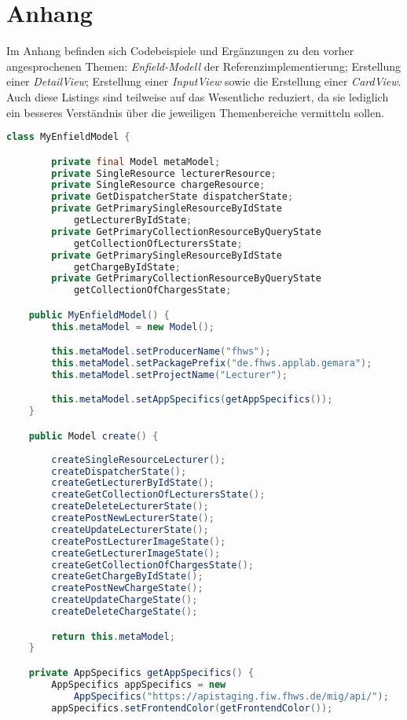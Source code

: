 \chapter{Anhang}

Im Anhang befinden sich Codebeispiele und Ergänzungen zu den vorher angesprochenen Themen: \textit{Enfield-Modell} der Referenzimplementierung; Erstellung einer \textit{DetailView}; Erstellung einer \textit{InputView} sowie die Erstellung einer \textit{CardView}. Auch diese Listings sind teilweise auf das Wesentliche reduziert, da sie lediglich ein besseres Verständnis über die jeweiligen Themenbereiche vermitteln sollen.

\newpage

\begin{lstlisting}[label=lst:enfield_model,
language=java,
firstnumber=1,
caption=Beschreibung des \textit{Enfield-Modell} der Referenzimplementierung. ]
class MyEnfieldModel {

		private final Model metaModel;
		private SingleResource lecturerResource;
		private SingleResource chargeResource;
		private GetDispatcherState dispatcherState;
		private GetPrimarySingleResourceByIdState
			getLecturerByIdState;
		private GetPrimaryCollectionResourceByQueryState 
			getCollectionOfLecturersState;
		private GetPrimarySingleResourceByIdState 
			getChargeByIdState;
		private GetPrimaryCollectionResourceByQueryState 
			getCollectionOfChargesState;

	public MyEnfieldModel() {
		this.metaModel = new Model();

		this.metaModel.setProducerName("fhws");
		this.metaModel.setPackagePrefix("de.fhws.applab.gemara");
		this.metaModel.setProjectName("Lecturer");

		this.metaModel.setAppSpecifics(getAppSpecifics());
	}

	public Model create() {
	
		createSingleResourceLecturer();
		createDispatcherState();
		createGetLecturerByIdState();
		createGetCollectionOfLecturersState();
		createDeleteLecturerState();
		createPostNewLecturerState();
		createUpdateLecturerState();
		createPostLecturerImageState();
		createGetLecturerImageState();
		createGetCollectionOfChargesState();
		createGetChargeByIdState();
		createPostNewChargeState();
		createUpdateChargeState();
		createDeleteChargeState();

		return this.metaModel;
	}

	private AppSpecifics getAppSpecifics() {
		AppSpecifics appSpecifics = new 
			AppSpecifics("https://apistaging.fiw.fhws.de/mig/api/");
		appSpecifics.setFrontendColor(getFrontendColor());


\end{lstlisting}
